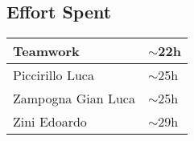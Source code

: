 \subsection{Effort Spent}
\begin{tabular}{| p{5cm} | p{5cm} |}
\hline
Teamwork & $\sim$22h\\
\hline
Piccirillo Luca & $\sim$25h\\
\hline
Zampogna Gian Luca & $\sim$25h\\
\hline
Zini Edoardo & $\sim$29h\\
\hline
\end{tabular}